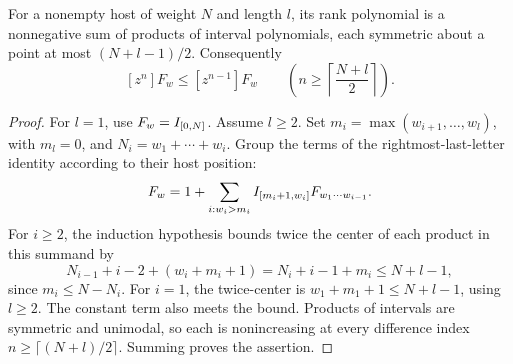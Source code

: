\begin{lemma}\label{lem:righttail}
For a nonempty host of weight $N$ and length $l$, its rank polynomial
is a nonnegative sum of products of interval polynomials, each
symmetric about a point at most $(N+l-1)/2$.
Consequently
\[
 [z^n]F_w\le[z^{n-1}]F_w
       \qquad\left(n\ge\left\lceil\frac{N+l}{2}\right\rceil\right).
\]
\end{lemma}
\begin{proof}
For $l=1$, use $F_w=I_{[0,N]}$. Assume $l\ge2$. Set
$m_i=\max(w_{i+1},\ldots,w_l)$, with $m_l=0$, and
$N_i=w_1+\cdots+w_i$. Group the terms of the rightmost-last-letter
identity according to their host position:
\[
 F_w=1+\sum_{i:w_i>m_i}I_{[m_i+1,w_i]}F_{w_1\cdots w_{i-1}}.
\]
For $i\ge2$, the induction hypothesis bounds twice the center of
each product in this summand by
\[
 N_{i-1}+i-2+(w_i+m_i+1)=N_i+i-1+m_i\le N+l-1,
\]
since $m_i\le N-N_i$. For $i=1$, the twice-center is
$w_1+m_1+1\le N+l-1$, using $l\ge2$.
The constant term also meets the bound. Products of intervals are
symmetric and unimodal, so each is nonincreasing at every difference
index $n\ge\lceil(N+l)/2\rceil$. Summing proves the assertion.
\end{proof}
